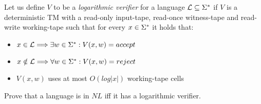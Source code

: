 Let us define $V$ to be a {\it logarithmic verifier} for a language $\mathcal{L} \subseteq \Sigma^*$ if $V$ is a
deterministic TM with a read-only input-tape, read-once witness-tape and
read-write working-tape such that for every $x \in \Sigma^*$ it holds that:
\begin{itemize}
    \item $x \in \mathcal{L} \Longrightarrow \exists w \in \Sigma^* : V (x, w) = accept$
    \item $x \notin \mathcal{L} \Longrightarrow \forall w \in \Sigma^* : V (x, w) = reject$
    \item $V (x, w)$ uses at most $O(log|x|)$ working-tape cells
\end{itemize}
Prove that a language is in $NL$ iff it has a logarithmic verifier.


